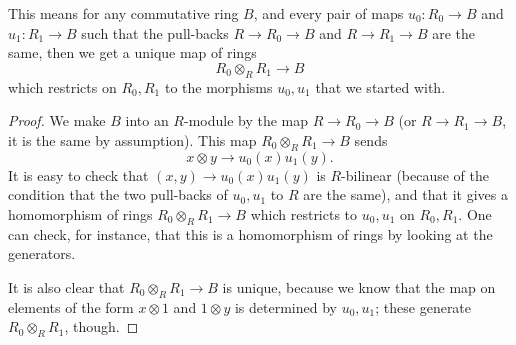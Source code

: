 This means for any commutative ring $B$, and every pair of maps $u_0: R_0 \to
B$ and $u_1: R_1 \to B$ such that the pull-backs $R \to R_0 \to B$ and $R \to
R_1 \to B$ are the same, then we get a unique map of rings
\[ R_0 \otimes_R R_1 \to B  \]
which restricts on $R_0, R_1$ to the morphisms $u_0, u_1$ that we started with.
\begin{proof} We make $B$ into an $R$-module by the map $R \to R_0 \to B$ (or
$R \to R_1 \to B$, it is the same by assumption).
This map $R_0 \otimes_R R_1 \to B$ sends
\[ x \otimes y \to u_0(x) u_1(y).  \]
It is easy to check that $(x,y) \to u_0(x)u_1(y)$ is $R$-bilinear (because of
the condition that the two pull-backs of $u_0, u_1$ to $R$ are the same), and
that it gives a homomorphism of rings $R_0 \otimes_R R_1 \to B$ which
restricts to $u_0, u_1$ on $R_0,
R_1$. One can check, for instance, that this is a homomorphism of rings by
looking at the generators.

It is also clear that $R_0 \otimes_R R_1 \to B$ is unique, because we know
that the
map on elements of the form $x \otimes 1$ and $1 \otimes y$ is determined by
$u_0, u_1$; these generate $R_0 \otimes_R R_1$, though.
\end{proof}


